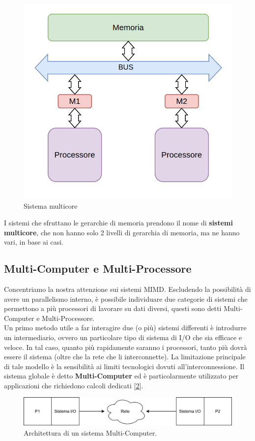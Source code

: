 \begin{figure}
    \centering
    \includegraphics[width=.5\textwidth]{img/P-M-BUS-M-P.png}
    \caption{Sistema multicore}\label{img:multi-core}
\end{figure}

I sistemi che sfruttano le gerarchie di memoria prendono il nome di \textbf{sistemi multicore}, che non hanno solo 2 livelli di gerarchia di memoria, ma ne hanno vari, in base ai casi.

\newpage
\subsection{Multi-Computer e Multi-Processore}
Concentriamo la nostra attenzione sui sistemi MIMD. Escludendo la possibilità di avere un parallelismo interno, è possibile individuare due categorie di sistemi che permettono a più processori di lavorare su dati diversi, questi sono detti Multi-Computer e Multi-Processore.
\\
Un primo metodo utile a far interagire due (o più) sistemi differenti è introdurre un intermediario, ovvero un particolare tipo di sistema di I/O che sia efficace e veloce. In tal caso, quanto più rapidamente saranno i processori, tanto più dovrà essere il sistema (oltre che la rete che li interconnette). La limitazione principale di tale modello è la sensibilità ai limiti tecnologici dovuti all'interconnessione. Il sistema globale è detto \textbf{Multi-Computer} ed è particolarmente utilizzato per applicazioni che richiedono calcoli dedicati [\ref{fig:multi-computer}].
\begin{figure}[!h]
    \centering
    \includegraphics[width=0.8\linewidth]{img/multi-processore.png}
    \caption{Architettura di un sistema Multi-Computer.}
    \label{fig:multi-computer}
\end{figure}

